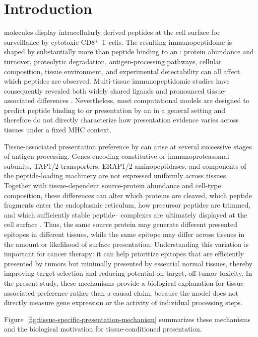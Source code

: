 \section{Introduction}

\plainMHCI{} molecules display intracellularly derived peptides at the cell surface for surveillance by cytotoxic CD8\(^{+}\) T cells. The resulting immunopeptidome is shaped by substantially more than peptide binding to an \plainMHC{}: protein abundance and turnover, proteolytic degradation, antigen-processing pathways, cellular composition, tissue environment, and experimental detectability can all affect which peptides are observed. Multi-tissue immunopeptidomic studies have consequently revealed both widely shared ligands and pronounced tissue-associated differences \cite{marcu2021atlas,schuster2018mouse}. Nevertheless, most computational models are designed to predict peptide binding to or presentation by an \plainMHC{} in a general setting and therefore do not directly characterize how presentation evidence varies across tissues under a fixed MHC context.

Tissue-associated presentation preference by \plainMHCI{} can arise at several successive stages of antigen processing. Genes encoding constitutive or immunoproteasomal subunits, TAP1/2 transporters, ERAP1/2 aminopeptidases, and components of the peptide-loading machinery are not expressed uniformly across tissues. Together with tissue-dependent source-protein abundance and cell-type composition, these differences can alter which proteins are cleaved, which peptide fragments enter the endoplasmic reticulum, how precursor peptides are trimmed, and which sufficiently stable peptide--\plainMHCI{} complexes are ultimately displayed at the cell surface \cite{kubiniok2022constitutive}. Thus, the same source protein may generate different presented epitopes in different tissues, while the same epitope may differ across tissues in the amount or likelihood of surface presentation. Understanding this variation is important for cancer therapy: it can help prioritize epitopes that are efficiently presented by tumors but minimally presented by essential normal tissues, thereby improving target selection and reducing potential on-target, off-tumor toxicity. In the present study, these mechanisms provide a biological explanation for tissue-associated preference rather than a causal claim, because the model does not directly measure gene expression or the activity of individual processing steps.

Figure~\ref{fig:tissue-specific-presentation-mechanism} summarizes these mechanisms and the biological motivation for tissue-conditioned presentation.

